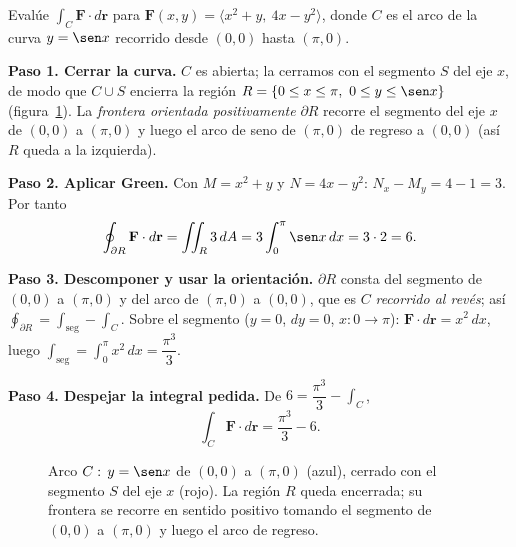 \begin{example}
Evalúe $\displaystyle\int_C \mathbf F\cdot d\mathbf r$ para
$\mathbf F(x,y)=\langle x^2+y,\ 4x-y^2\rangle$, donde $C$ es el arco de la
curva $y=\sen x$ recorrido desde $(0,0)$ hasta $(\pi,0)$.
\begin{myproof}
\textbf{Paso 1. Cerrar la curva.}
$C$ es abierta; la cerramos con el segmento $S$ del eje $x$, de modo que
$C\cup S$ encierra la región $R=\{0\le x\le\pi,\ 0\le y\le\sen x\}$
(figura~\ref{fig:green_curva_abierta}). La \emph{frontera orientada
positivamente} $\partial R$ recorre el segmento del eje $x$ de $(0,0)$ a
$(\pi,0)$ y luego el arco de seno de $(\pi,0)$ de regreso a $(0,0)$ (así $R$
queda a la izquierda).

\textbf{Paso 2. Aplicar Green.}
Con $M=x^2+y$ y $N=4x-y^2$: $N_x-M_y=4-1=3$. Por tanto
\[
  \oint_{\partial R}\mathbf F\cdot d\mathbf r=\iint_R 3\,dA
  =3\int_0^\pi \sen x\,dx=3\cdot 2=6.
\]

\textbf{Paso 3. Descomponer y usar la orientación.}
$\partial R$ consta del segmento de $(0,0)$ a $(\pi,0)$ y del arco de $(\pi,0)$
a $(0,0)$, que es $C$ \emph{recorrido al revés}; así
$\oint_{\partial R}=\int_{\text{seg}}-\int_C$. Sobre el segmento ($y=0$,
$dy=0$, $x:0\to\pi$): $\mathbf F\cdot d\mathbf r=x^2\,dx$, luego
$\int_{\text{seg}}=\int_0^\pi x^2\,dx=\dfrac{\pi^3}{3}$.

\textbf{Paso 4. Despejar la integral pedida.}
De $6=\dfrac{\pi^3}{3}-\int_C$,
\[
  \boxed{\ \int_C\mathbf F\cdot d\mathbf r=\frac{\pi^3}{3}-6.\ }
\]
\end{myproof}
\end{example}

\begin{figure}[!htbp]
\centering
{}
\caption{Arco $C:\,y=\sen x$ de $(0,0)$ a $(\pi,0)$ (azul), cerrado con el
  segmento $S$ del eje $x$ (rojo). La región $R$ queda encerrada; su frontera
  se recorre en sentido positivo tomando el segmento de $(0,0)$ a $(\pi,0)$ y
  luego el arco de regreso.}
\label{fig:green_curva_abierta}
\end{figure}

